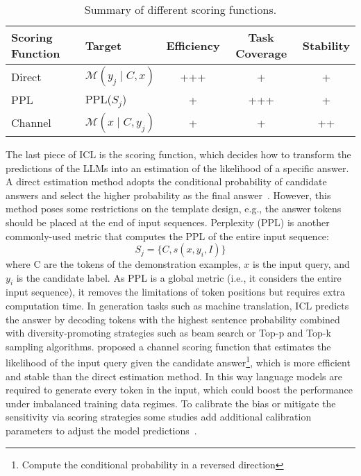 \begin{table}[h!]
	\centering
	\small
	\begin{tabularx}{0.8\textwidth}{lXccc}
		\toprule
		\textbf{Scoring Function} & \textbf{Target}              & \textbf{Efficiency} & \textbf{Task Coverage} & \textbf{Stability} \\
		\midrule
		Direct                    & $\mathcal{M}(y_j \mid C, x)$ & +++                 & +                      & +                  \\
		PPL                       & PPL($S_j$)                   & +                   & +++                    & +                  \\
		Channel                   & $\mathcal{M}(x \mid C, y_j)$ & +                   & +                      & ++                 \\
		\bottomrule
	\end{tabularx}
	\caption{Summary of different scoring functions.}
	\label{tab:scoring-functions}
\end{table}

The last piece of ICL is the scoring function, which decides how to transform the predictions of the LLMs into an estimation of the likelihood of a specific answer.
A direct estimation method adopts the conditional probability of candidate answers and select the higher probability as the final answer~\cite{brown2020language}.
However, this method poses some restrictions on the template design, e.g., the answer tokens should be placed at the end of input sequences.
Perplexity (PPL) is another commonly-used metric that computes the PPL of the entire input sequence:
\begin{equation}
	S_j = \{C,s(x,y_i,I)\}
	\label{eq:ppl}
\end{equation}
where C are the tokens of the demonstration examples, $x$ is the input query, and $y_i$ is the candidate label.
As PPL is a global metric (i.e., it considers the entire input sequence), it removes the limitations of token positions but requires extra computation time.
In generation tasks such as machine translation, ICL predicts the answer by decoding tokens with the highest sentence probability combined with diversity-promoting strategies such as beam search or Top-p and Top-k~\cite{holzman2020curious} sampling algorithms.
\textcite{min2022noisy} proposed a channel scoring function that estimates the likelihood of the input query given the candidate answer\footnote{Compute the conditional
	probability in a reversed direction}, which is more efficient and stable than the direct estimation method.
In this way language models are required to generate every token in the input, which could boost the performance under imbalanced training data regimes.
To calibrate the bias or mitigate the sensitivity via scoring strategies some studies add additional calibration parameters to adjust the model predictions~\cite{zhao2021calibrate}.

